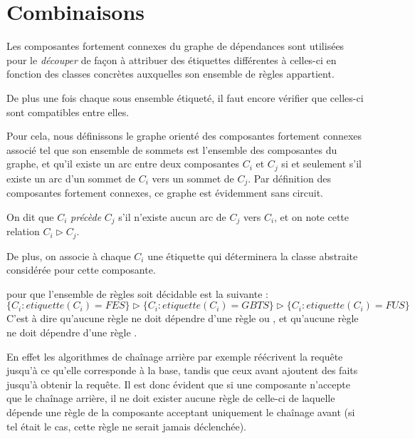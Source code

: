 \section{Combinaisons}\label{combine}
Les composantes fortement connexes du graphe de dépendances sont utilisées pour le 
{\em découper} de façon à attribuer des étiquettes différentes à celles-ci en fonction
des classes concrètes auxquelles son ensemble de règles appartient.

De plus une fois chaque sous ensemble étiqueté, il faut encore vérifier que celles-ci
sont compatibles entre elles.

Pour cela, nous définissons le graphe orienté des composantes fortement connexes associé
tel que son ensemble de sommets est l'ensemble des composantes du graphe, et
qu'il existe un arc entre deux composantes $C_i$ et $C_j$ si et seulement s'il existe un
arc d'un sommet de $C_i$ vers un sommet de $C_j$.
Par définition des composantes fortement connexes, ce graphe est évidemment sans
circuit.

On dit que $C_i$ {\em précède} $C_j$ s'il n'existe aucun arc de $C_j$ vers $C_i$, et on
note cette relation $C_i \triangleright C_j$.

De plus,
on associe à chaque $C_i$ une étiquette qui déterminera la classe abstraite considérée pour
cette composante.

pour que l'ensemble de règles soit décidable est la suivante :\\
$\{C_i : etiquette(C_i) = FES\} \triangleright \{C_i : etiquette(C_i) = GBTS\} \triangleright
\{C_i : etiquette(C_i) = FUS\}$
C'est à dire qu'aucune règle \fes ne doit dépendre d'une règle \fus ou \gbts, et
qu'aucune règle \gbts ne doit dépendre d'une règle \fus.

En effet les algorithmes de chaînage arrière par exemple réécrivent la requête jusqu'à ce
qu'elle corresponde à la base, tandis que ceux avant ajoutent des faits jusqu'à obtenir
la requête. Il est donc évident que si une composante n'accepte que le chaînage arrière,
il ne doit exister aucune règle de celle-ci de laquelle dépende une règle de la
composante acceptant uniquement le chaînage avant (si tel était le cas, cette règle ne
serait jamais déclenchée).


